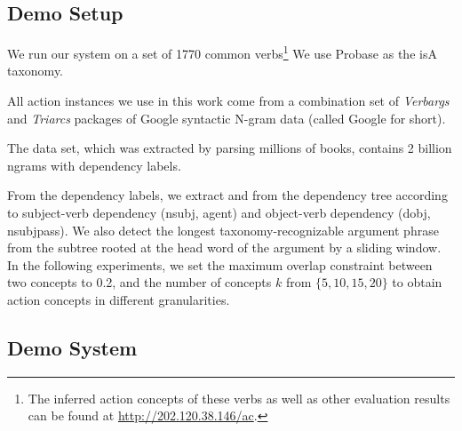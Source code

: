 \subsection{Demo Setup}
\label{sec:preprocess}

We run our system on a set of 1770 common verbs\footnote{The inferred action concepts
of these verbs as well as other evaluation results can be found at
\url{http://202.120.38.146/ac}.}
We use Probase\cite{WuLWZ12} %
as the isA taxonomy.

All action instances we use in this work come
from a combination set of
{\em Verbargs} and {\em Triarcs} packages of Google syntactic N-gram
data\cite{goldberg2013,googlengram} (called Google for short).

The data set, which was extracted by parsing millions of books,
contains 2 billion ngrams with dependency labels.

From the dependency labels, we extract  and 
from the dependency tree according to subject-verb dependency (nsubj,
agent) and object-verb dependency (dobj, nsubjpass). We also
detect the longest taxonomy-recognizable argument phrase from the
subtree rooted at the head word of the argument by a sliding
window.
In the following experiments, we set the maximum overlap
constraint between two concepts to 0.2, and the number of concepts
$k$ from $\{5, 10, 15, 20\}$ to obtain action concepts in different granularities.


\subsection{Demo System}
\label{sec:demo}

